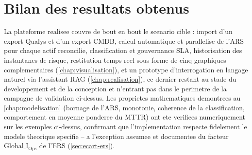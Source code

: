\section{Bilan des resultats obtenus}

La plateforme realisee couvre de bout en bout le scenario cible : import d'un
export Qualys et d'un export CMDB, calcul automatique et parallelise de l'ARS pour
chaque actif reconcilie, classification et gouvernance SLA, historisation des
instantanes de risque, restitution temps reel sous forme de cinq graphiques
complementaires (\cref{chap:visualisation}), et un prototype d'interrogation en
langage naturel via l'assistant RAG (\cref{chap:realisation}), ce dernier restant au
stade du developpement et de la conception et n'entrant pas dans le perimetre de la
campagne de validation ci-dessus. Les proprietes mathematiques demontrees au
\cref{chap:modelisation} (bornage de l'ARS, monotonie, coherence de la
classification, comportement en moyenne ponderee du MTTR) ont ete verifiees
numeriquement sur les exemples ci-dessus, confirmant que l'implementation respecte
fidelement le modele theorique specifie -- a l'exception assumee et documentee du
facteur $\mathrm{Global\_I_{Ops}}$ de l'ERS (\cref{sec:ecart-ers}).
